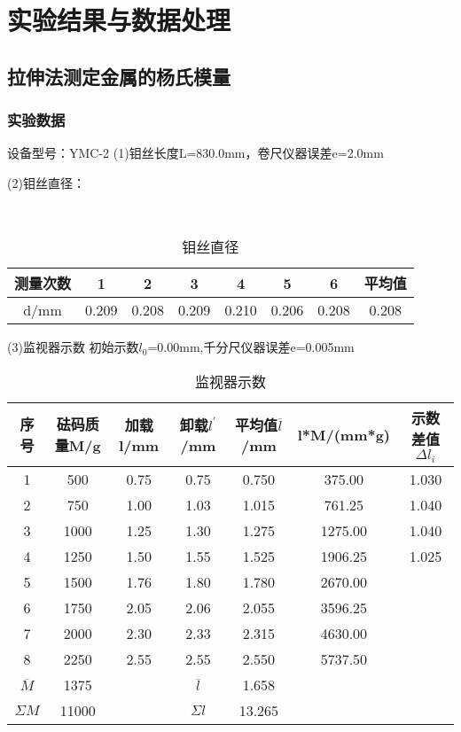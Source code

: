 \documentclass[UTF-8,twoside,cs4size]{ctexart}
\begin{document}
\section{实验结果与数据处理}
\subsection{拉伸法测定金属的杨氏模量}
\subsubsection{实验数据}
设备型号：YMC-2
(1)钼丝长度L=830.0mm，卷尺仪器误差e=2.0mm 

(2)钼丝直径： 
\begin{table}[!h]
    \centering\
    \caption{钼丝直径}
    \begin{tabular}{|c|c|c|c|c|c|c|c|}
    \hline
        测量次数&1&2&3&4&5&6&平均值\\\hline
        d/mm&0.209&0.208&0.209&0.210&0.206&0.208&0.208\\\hline
    \end{tabular}
\end{table}

(3)监视器示数
初始示数$l_0$=0.00mm,千分尺仪器误差e=0.005mm
\begin{table}[!h]
    \centering
    \caption{监视器示数}
    \begin{tabular}{|c|c|c|c|c|c|c|}
        \hline
        序号&砝码质量M/g&加载l/mm&卸载$l^'$/mm&平均值$\overline{l}$/mm&l*M/(mm*g)&示数差值$\Delta l_i$\\\hline
        1&500&0.75&0.75&0.750&375.00&1.030\\\hline
        2&750&1.00&1.03&1.015&761.25&1.040\\\hline
        3&1000&1.25&1.30&1.275&1275.00&1.040\\\hline
        4&1250&1.50&1.55&1.525&1906.25&1.025\\\hline
        5&1500&1.76&1.80&1.780&2670.00&\\\hline
        6&1750&2.05&2.06&2.055&3596.25&\\\hline
        7&2000&2.30&2.33&2.315&4630.00&\\\hline
        8&2250&2.55&2.55&2.550&5737.50&\\\hline
        $\overline{M}$&1375& &$\overline{l}$&1.658&&\\\hline
       $\Sigma M$&11000& &$\Sigma l$&13.265&&\\\hline
    \end{tabular}
\end{table}
\end{document}
